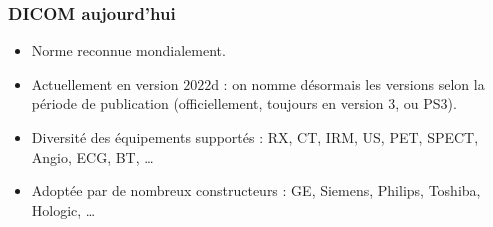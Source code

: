 	\frame
	{
		\frametitle{DICOM aujourd'hui}
		\begin{itemize}
			\item<1-> Norme reconnue mondialement.
			\item<2-> Actuellement en version $2022$d : on nomme d\'esormais les versions selon la p\'eriode de publication (officiellement, toujours en version 3, ou PS3).
			\item<3-> Diversit\'e des \'equipements support\'es : RX, CT, IRM, US, PET, SPECT, Angio, ECG, BT, \ldots
			\item<4-> Adopt\'ee par de nombreux constructeurs : GE, Siemens, Philips, Toshiba, Hologic, \ldots
		\end{itemize}
	}

